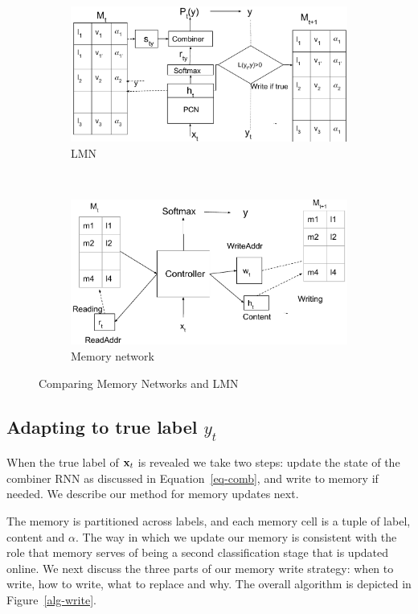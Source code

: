 \documentclass[letterpaper]{article} %
\newcommand{\vek}[1]{{\bf {#1}}}
\newcommand{\vx}{{\vek{x}}}
\def\shiv#1{\todo [color=orange]{Shiv: #1}}
\newcommand{\rulesep}{\unskip\ \vrule\ }
\begin{document}
\begin{figure}
\begin{subfigure}[b]{0.5\textwidth}
\begin{center}
  \includegraphics[width=0.9\hsize]{lmn.pdf}
  \caption{LMN}
  \label{fig:lmn}
  \end{center}
 \end{subfigure}
 \rulesep
 \begin{subfigure}[b]{0.5\textwidth}
 \begin{center}
  \includegraphics[width=0.9\hsize]{mem_net.pdf}
  \caption{Memory network}
  \label{fig:mem_net}
  \end{center}
 \end{subfigure}
\caption{Comparing Memory Networks and LMN}
\label{fig:net_comparison}
\end{figure}



\subsection{Adapting to true label $y_t$}
When the true label of $\vx_t$ is revealed we take two steps: update the state of the combiner RNN as discussed in Equation~\ref{eq-comb}, and write to memory if needed.  We describe our method for memory updates next.

The memory is partitioned across labels, and each memory cell is a tuple of label, content and $\alpha$.  %
The way in which we update our memory is consistent with the role that memory serves of being a second classification stage that is updated online.  We next discuss the three parts of our memory write strategy: when to write, how to write, what to replace and why. The overall algorithm is depicted in Figure~\ref{alg-write}.
\end{document}
